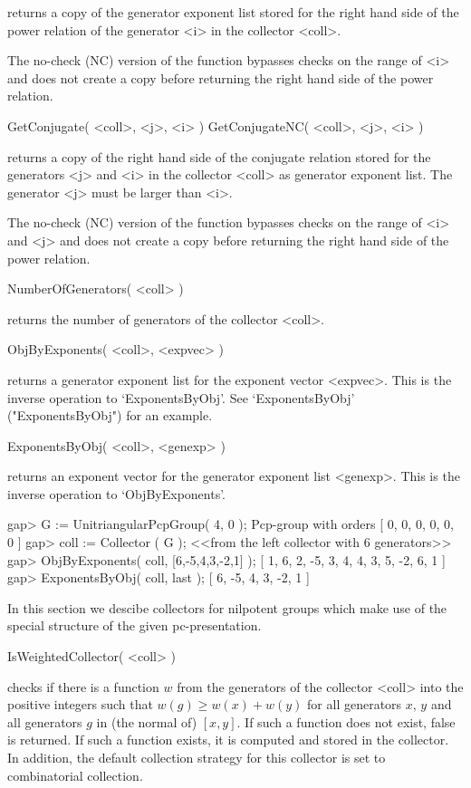 returns a  copy of  the generator exponent  list stored for  the right
hand side of the power relation  of the generator <i> in the collector
<coll>.

The no-check (NC) version of the function bypasses checks on the range
of <i> and does not create a copy before returning the right hand side
of the power relation.

\>GetConjugate( <coll>, <j>, <i> )
\>GetConjugateNC( <coll>, <j>, <i> )

returns a copy of the right hand side of the conjugate relation stored
for the generators <j> and <i> in the collector <coll> as generator
exponent list.  The generator <j> must be larger than <i>.

The no-check (NC) version of the function bypasses checks on the range
of <i> and  <j> and does not create a copy  before returning the right
hand side of the power relation.

\>NumberOfGenerators( <coll> )

returns the number of generators of the collector <coll>.

\>ObjByExponents( <coll>, <expvec> )

returns a generator exponent list for the exponent vector <expvec>.
This is the inverse operation to `ExponentsByObj'.  See
`ExponentsByObj' ("ExponentsByObj") for an example.


\>ExponentsByObj( <coll>, <genexp> )

returns an exponent vector for the generator exponent list <genexp>.
This is the inverse operation to `ObjByExponents'.

\beginexample
gap> G := UnitriangularPcpGroup( 4, 0 );   
Pcp-group with orders [ 0, 0, 0, 0, 0, 0 ]
gap> coll := Collector ( G );
<<from the left collector with 6 generators>>
gap> ObjByExponents( coll, [6,-5,4,3,-2,1] );
[ 1, 6, 2, -5, 3, 4, 4, 3, 5, -2, 6, 1 ]
gap> ExponentsByObj( coll, last );
[ 6, -5, 4, 3, -2, 1 ]
\endexample



In this section we descibe collectors for nilpotent groups which make
use of the special structure of the given pc-presentation.

\>IsWeightedCollector( <coll> )

checks if there is a function $w$ from the generators of the collector
<coll> into the positive integers  such that $w(g) \geq w(x)+w(y)$ for
all  generators $x$, $y$  and all  generators $g$  in (the  normal of)
$[x,y]$.  If  such a function does  not exist, false  is returned.  If
such a  function exists, it is  computed and stored in  the collector. 
In addition, the default collection strategy for this collector is set
to combinatorial collection.

